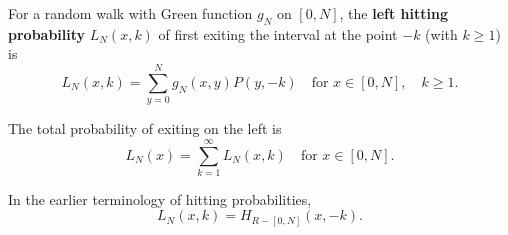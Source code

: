 For a random walk with Green function $g_N$ on $[0,N]$, the \textbf{left hitting probability} $L_N(x,k)$ of first exiting the interval at the point $-k$ (with $k \geq 1$) is
$$L_N(x,k) = \sum_{y=0}^{N} g_N(x,y) P(y, -k) \quad \text{for } x \in [0,N], \quad k \geq 1.$$

The total probability of exiting on the left is
$$L_N(x) = \sum_{k=1}^{\infty} L_N(x,k) \quad \text{for } x \in [0,N].$$

In the earlier terminology of hitting probabilities,
$$L_N(x,k) = H_{R-[0,N]}(x, -k).$$
